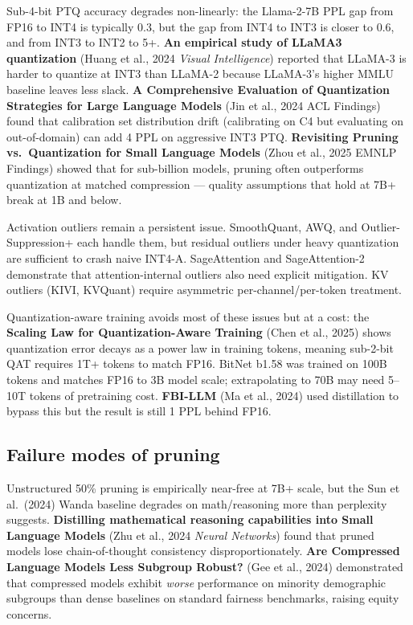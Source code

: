 Sub-4-bit PTQ accuracy degrades non-linearly: the Llama-2-7B PPL gap from FP16 to INT4 is typically 0.3, but the gap from INT4 to INT3 is closer to 0.6, and from INT3 to INT2 to 5+. \textbf{An empirical study of LLaMA3 quantization} (Huang et al., 2024 \emph{Visual Intelligence}) reported that LLaMA-3 is harder to quantize at INT3 than LLaMA-2 because LLaMA-3's higher MMLU baseline leaves less slack. \textbf{A Comprehensive Evaluation of Quantization Strategies for Large Language Models} (Jin et al., 2024 ACL Findings) found that calibration set distribution drift (calibrating on C4 but evaluating on out-of-domain) can add 4 PPL on aggressive INT3 PTQ. \textbf{Revisiting Pruning vs.~Quantization for Small Language Models} (Zhou et al., 2025 EMNLP Findings) showed that for sub-billion models, pruning often outperforms quantization at matched compression --- quality assumptions that hold at 7B+ break at 1B and below.

Activation outliers remain a persistent issue. SmoothQuant, AWQ, and Outlier-Suppression+ each handle them, but residual outliers under heavy quantization are sufficient to crash naive INT4-A. SageAttention and SageAttention-2 demonstrate that attention-internal outliers also need explicit mitigation. KV outliers (KIVI, KVQuant) require asymmetric per-channel/per-token treatment.

Quantization-aware training avoids most of these issues but at a cost: the \textbf{Scaling Law for Quantization-Aware Training} (Chen et al., 2025) shows quantization error decays as a power law in training tokens, meaning sub-2-bit QAT requires 1T+ tokens to match FP16. BitNet b1.58 was trained on 100B tokens and matches FP16 to 3B model scale; extrapolating to 70B may need 5--10T tokens of pretraining cost. \textbf{FBI-LLM} (Ma et al., 2024) used distillation to bypass this but the result is still 1 PPL behind FP16.

\subsection{Failure modes of pruning}\label{failure-modes-of-pruning}

Unstructured 50\% pruning is empirically near-free at 7B+ scale, but the Sun et al.~(2024) Wanda baseline degrades on math/reasoning more than perplexity suggests. \textbf{Distilling mathematical reasoning capabilities into Small Language Models} (Zhu et al., 2024 \emph{Neural Networks}) found that pruned models lose chain-of-thought consistency disproportionately. \textbf{Are Compressed Language Models Less Subgroup Robust?} (Gee et al., 2024) demonstrated that compressed models exhibit \emph{worse} performance on minority demographic subgroups than dense baselines on standard fairness benchmarks, raising equity concerns.

